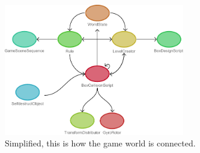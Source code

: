 \begin{figure}[ht]
        \capstart
        \centering
        \includegraphics[width=0.7\textwidth]{images/game_world_class_chart}
        \caption[World game class chart]{Simplified, this is how the game world is connected.}
        \label{fig:world_game}
\end{figure}



